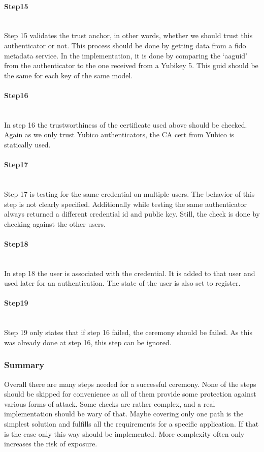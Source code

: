 \documentclass[a4paper, 11pt]{scrartcl}
\begin{document}
\paragraph{Step15}\hfill \\ 
Step 15 validates the trust anchor, in other words, whether we should trust this authenticator or not. This process should be done by getting data from a \gls{fido} metadata service. In the implementation, it is done by comparing the `aaguid' from the authenticator to the one received from a Yubikey 5. This guid should be the same for each key of the same model.

\paragraph{Step16}\hfill \\ 
In step 16 the trustworthiness of the certificate used above should be checked. Again as we only trust Yubico authenticators, the CA cert from Yubico is statically used.

\paragraph{Step17}\hfill \\ 
Step 17 is testing for the same credential on multiple users. The behavior of this step is not clearly specified. Additionally while testing the same authenticator always returned a different credential id and public key. Still, the check is done by checking against the other users.

\paragraph{Step18}\hfill \\ 
In step 18 the user is associated with the credential. It is added to that user and used later for an authentication. The state of the user is also set to register. 

\paragraph{Step19}\hfill \\ 
Step 19 only states that if step 16 failed, the ceremony should be failed. As this was already done at step 16, this step can be ignored.

\subsubsection{Summary}
Overall there are many steps needed for a successful ceremony. None of the steps should be skipped for convenience as all of them provide some protection against various forms of attack. Some checks are rather complex, and a real implementation should be wary of that. Maybe covering only one path is the simplest solution and fulfills all the requirements for a specific application. If that is the case only this way should be implemented. More complexity often only increases the risk of exposure.
\end{document}
